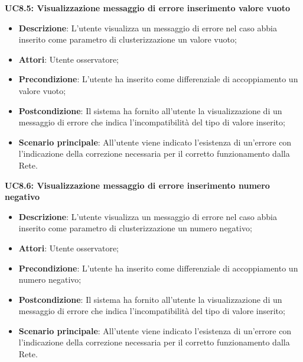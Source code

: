 \textbf{UC8.5: Visualizzazione messaggio di errore inserimento valore vuoto}\mbox{}
\label{UC8.5: Visualizzazione messaggio di errore per inserimento valore vuoto}
\noindent
\begin{itemize}
\item \textbf{Descrizione}: L'utente visualizza un messaggio di errore nel caso abbia inserito come parametro di clusterizzazione un valore vuoto;
\item \textbf{Attori}: Utente osservatore;
\item \textbf{Precondizione}: L'utente ha inserito come differenziale di accoppiamento un valore vuoto;
\item \textbf{Postcondizione}: Il sistema ha fornito all'utente la visualizzazione di un messaggio di errore che indica  l'incompatibilit\`a del tipo di valore inserito;
\item \textbf{Scenario principale}: All'utente viene indicato l'esistenza di un'errore con l'indicazione della correzione necessaria per il corretto funzionamento dalla Rete.
\end{itemize}

\textbf{UC8.6: Visualizzazione messaggio di errore inserimento numero negativo}\mbox{}
\label{UC8.6: Visualizzazione messaggio di errore per inserimento numero negativo}
\noindent
\begin{itemize}
\item \textbf{Descrizione}: L'utente visualizza un messaggio di errore nel caso abbia inserito come parametro di clusterizzazione un numero negativo;
\item \textbf{Attori}: Utente osservatore;
\item \textbf{Precondizione}: L'utente ha inserito come differenziale di accoppiamento un numero negativo;
\item \textbf{Postcondizione}: Il sistema ha fornito all'utente la visualizzazione di un messaggio di errore che indica  l'incompatibilit\`a del tipo di valore inserito;
\item \textbf{Scenario principale}: All'utente viene indicato l'esistenza di un'errore con l'indicazione della correzione necessaria per il corretto funzionamento dalla Rete.
\end{itemize}

